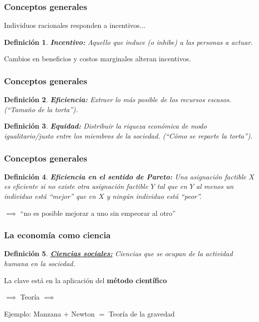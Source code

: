 \documentclass[dvipsnames,table]{beamer}
\newtheorem{mydef}{Definición}
\begin{document}
		\begin{frame}
			\frametitle{Conceptos generales}
			Individuos racionales responden a incentivos...
			\begin{mydef}
				\textbf{Incentivo:} Aquello que induce (o inhibe) a las personas a actuar.
			\end{mydef}
			\vspace{.3cm}
			Cambios en beneficios y costos marginales alteran incentivos.
		\end{frame}

		\begin{frame}
			\frametitle{Conceptos generales}
			\begin{mydef}
				\textbf{Eficiencia:} Extraer lo más posible de los recursos escasos. (``Tamaño de la torta'').
			\end{mydef}
			\begin{mydef}
				\textbf{Equidad:} Distribuir la riqueza económica de modo igualitario/justo entre los miembros de la sociedad. (``Cómo se reparte la torta'').
			\end{mydef}
		\end{frame}

		\begin{frame}
			\frametitle{Conceptos generales}
			\begin{mydef}
				\textbf{Eficiencia en el sentido de Pareto:} Una asignación factible $X$ es eficiente si no existe otra asignación factible $Y$ tal que en $Y$ al menos un individuo está ``mejor'' que en $X$ y ningún individuo está ``peor''.
			\end{mydef}
			\vspace{.3cm}
			$\implies$ ``no es posible mejorar a uno sin empeorar al otro''
		\end{frame}

		\begin{frame}
			\frametitle{La economía como ciencia}
			\begin{mydef}
				\href{http://dle.rae.es/?id=9AwuYaT}{\textbf{Ciencias sociales:}} Ciencias que se ocupan de la actividad humana en la sociedad.
			\end{mydef}
			\vspace{.3cm}
			La clave está en la aplicación del \textbf{método científico}
			
			\vspace{.4cm}
			$\implies$ Teoría $\implies$\pbox{\textwidth}{Observación \\ (datos)}
			
			\vspace{.4cm}
			Ejemplo: Manzana $+$ Newton $=$ Teoría de la gravedad
		\end{frame}
	
\end{document}
